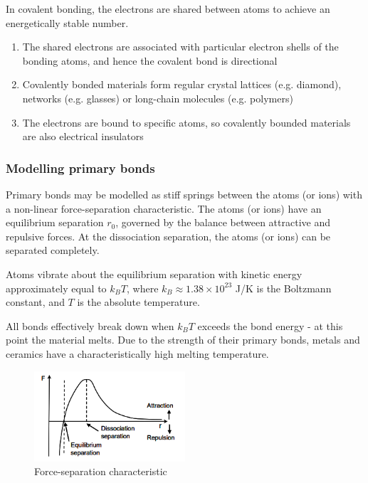 \documentclass{article}
\begin{document}
\begin{definition}
    In covalent bonding, the electrons are shared between atoms to achieve an energetically stable number.

    \begin{enumerate}
        \item The shared electrons are associated with particular electron shells of the bonding atoms, and hence the covalent bond is directional
        \item Covalently bonded materials form regular crystal lattices (e.g. diamond), networks (e.g. glasses) or long-chain molecules (e.g. polymers)
        \item The electrons are bound to specific atoms, so covalently bounded materials are also electrical insulators
    \end{enumerate}
\end{definition}

\subsubsection{Modelling primary bonds}

Primary bonds may be modelled as stiff springs between the atoms (or ions) with a non-linear force-separation characteristic. The atoms (or ions) have an equilibrium separation $r_0$, governed by the balance between attractive and repulsive forces. At the dissociation separation, the atoms (or ions) can be separated completely. 

Atoms vibrate about the equilibrium separation with kinetic energy approximately equal to $k_BT$, where $k_B \approx 1.38 \times 10^{23}$ J/K is the Boltzmann constant, and $T$ is the absolute temperature. 

All bonds effectively break down when $k_BT$ exceeds the bond energy - at this point the material melts. Due to the strength of their primary bonds, metals and ceramics have a characteristically high melting temperature.

\begin{figure}[ht!]
    \centering
    \includegraphics[width = 0.5\textwidth]{images/bond1.png}
    \caption{Force-separation characteristic}
    \label{fig:enter-label}
\end{figure}
\end{document}
